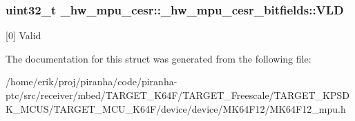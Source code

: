 \subsubsection[{\texorpdfstring{V\+LD}{VLD}}]{\setlength{\rightskip}{0pt plus 5cm}uint32\+\_\+t \+\_\+hw\+\_\+mpu\+\_\+cesr\+::\+\_\+hw\+\_\+mpu\+\_\+cesr\+\_\+bitfields\+::\+V\+LD}\hypertarget{struct__hw__mpu__cesr_1_1__hw__mpu__cesr__bitfields_a72414abd5ae919d6ed475c1c650e722e}{}\label{struct__hw__mpu__cesr_1_1__hw__mpu__cesr__bitfields_a72414abd5ae919d6ed475c1c650e722e}
\mbox{[}0\mbox{]} Valid 

The documentation for this struct was generated from the following file\+:\begin{DoxyCompactItemize}
\item 
/home/erik/proj/piranha/code/piranha-\/ptc/src/receiver/mbed/\+T\+A\+R\+G\+E\+T\+\_\+\+K64\+F/\+T\+A\+R\+G\+E\+T\+\_\+\+Freescale/\+T\+A\+R\+G\+E\+T\+\_\+\+K\+P\+S\+D\+K\+\_\+\+M\+C\+U\+S/\+T\+A\+R\+G\+E\+T\+\_\+\+M\+C\+U\+\_\+\+K64\+F/device/device/\+M\+K64\+F12/M\+K64\+F12\+\_\+mpu.\+h\end{DoxyCompactItemize}
